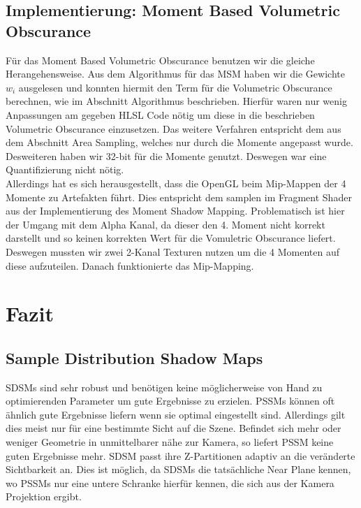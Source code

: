 \documentclass[runningheaders,a4paper]{llncs}
\begin{document}
\subsection{Implementierung: Moment Based Volumetric Obscurance}



Für das Moment Based Volumetric Obscurance benutzen wir die gleiche Herangehensweise.
Aus dem Algorithmus für das MSM haben wir die Gewichte $w_i$ ausgelesen und konnten hiermit den Term für die Volumetric Obscurance berechnen, wie im Abschnitt Algorithmus beschrieben. Hierfür waren nur wenig Anpassungen am gegeben HLSL Code nötig um diese in die beschrieben Volumetric Obscurance einzusetzen. Das weitere Verfahren entspricht dem aus dem Abschnitt Area Sampling, welches nur durch die Momente angepasst wurde. \\
Desweiteren haben wir 32-bit für die Momente genutzt. Deswegen war eine Quantifizierung nicht nötig.\\
Allerdings hat es sich herausgestellt, dass die OpenGL beim Mip-Mappen der 4 Momente zu Artefakten führt. Dies entspricht dem samplen im Fragment Shader aus der Implementierung des Moment Shadow Mapping. Problematisch ist hier der Umgang mit dem Alpha Kanal, da dieser den 4. Moment nicht korrekt darstellt und so keinen  korrekten Wert für die Vomuletric Obscurance liefert. Deswegen mussten wir zwei 2-Kanal Texturen nutzen um die 4 Momenten auf diese aufzuteilen. Danach funktionierte das Mip-Mapping.



\section{Fazit}


\subsection{Sample Distribution Shadow Maps}
SDSMs sind sehr robust und benötigen keine möglicherweise von Hand zu optimierenden Parameter um gute Ergebnisse zu erzielen.
PSSMs können oft ähnlich gute Ergebnisse liefern wenn sie optimal eingestellt sind.
Allerdings gilt dies meist nur für eine bestimmte Sicht auf die Szene.
Befindet sich mehr oder weniger Geometrie in unmittelbarer nähe zur Kamera, so liefert PSSM keine guten Ergebnisse mehr.
SDSM passt ihre Z-Partitionen adaptiv an die veränderte Sichtbarkeit an.
Dies ist möglich, da SDSMs die tatsächliche Near Plane kennen, wo PSSMs nur eine untere Schranke hierfür kennen, die sich aus der Kamera Projektion ergibt.
\end{document}
